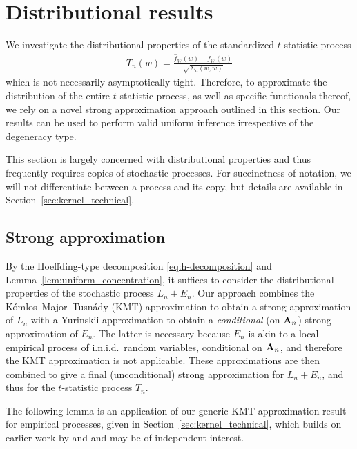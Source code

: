 \section{Distributional results}\label{sec:kernel_inference}

We investigate the distributional properties of the
standardized $t$-statistic process
%
\begin{align*}
  T_n(w) = \frac{\hat{f}_W(w) - f_W(w)}{\sqrt{\Sigma_n(w,w)}}
\end{align*}
%
which is not necessarily asymptotically tight. Therefore, to approximate the
distribution of the entire $t$-statistic process, as well as specific
functionals thereof, we rely on a novel strong approximation approach outlined
in this section. Our results can be used to perform valid uniform inference
irrespective of the degeneracy type.

This section is largely concerned with distributional properties and thus
frequently requires copies of stochastic processes. For succinctness of
notation, we will not differentiate between a process and its copy, but details
are available in Section~\ref{sec:kernel_technical}.

\subsection{Strong approximation}

By the Hoeffding-type decomposition \eqref{eq:h-decomposition} and
Lemma~\ref{lem:uniform_concentration}, it suffices to consider the
distributional properties of the stochastic process $L_n + E_n$.
Our approach combines the K{\'o}mlos--Major--Tusn{\'a}dy (KMT) approximation
\citep{komlos1975approximation} to obtain a strong approximation of $L_n$ with
a Yurinskii approximation \citep{yurinskii1978error} to obtain a
\emph{conditional} (on $\mathbf{A}_n$) strong approximation of $E_n$. The latter is
necessary because $E_n$ is akin to a local empirical process of i.n.i.d.\
random variables, conditional on $\mathbf{A}_n$, and therefore the KMT approximation
is not applicable. These approximations are then combined to give a final
(unconditional) strong approximation for $L_n+E_n$, and thus for the
$t$-statistic process $T_n$.

The following lemma is an application of our generic KMT approximation result
for empirical processes, given in Section~\ref{sec:kernel_technical}, which
builds on earlier work by \citet{gine2004kernel} and \citet{gine2010confidence}
and may be of independent interest.

